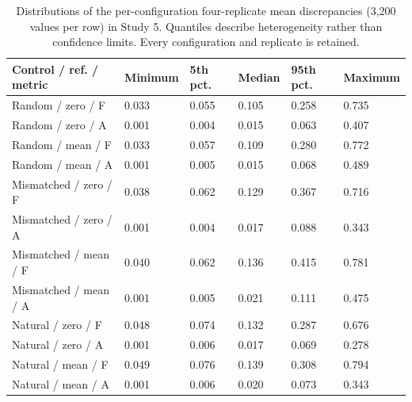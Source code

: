 \begin{table}[H]
\centering\footnotesize
\setlength{\tabcolsep}{3pt}
\caption{Distributions of the per-configuration four-replicate mean discrepancies (3,200 values per row) in Study 5. Quantiles describe heterogeneity rather than confidence limits. Every configuration and replicate is retained.}
\label{tab:null-distributions}
\begin{tabularx}{\linewidth}{@{}lYYYYY@{}}
\toprule
Control / ref. / metric & Minimum & 5th pct. & Median & 95th pct. & Maximum \\
\midrule
Random / zero / F & 0.033 & 0.055 & 0.105 & 0.258 & 0.735 \\
Random / zero / A & 0.001 & 0.004 & 0.015 & 0.063 & 0.407 \\
Random / mean / F & 0.033 & 0.057 & 0.109 & 0.280 & 0.772 \\
Random / mean / A & 0.001 & 0.005 & 0.015 & 0.068 & 0.489 \\
Mismatched / zero / F & 0.038 & 0.062 & 0.129 & 0.367 & 0.716 \\
Mismatched / zero / A & 0.001 & 0.004 & 0.017 & 0.088 & 0.343 \\
Mismatched / mean / F & 0.040 & 0.062 & 0.136 & 0.415 & 0.781 \\
Mismatched / mean / A & 0.001 & 0.005 & 0.021 & 0.111 & 0.475 \\
Natural / zero / F & 0.048 & 0.074 & 0.132 & 0.287 & 0.676 \\
Natural / zero / A & 0.001 & 0.006 & 0.017 & 0.069 & 0.278 \\
Natural / mean / F & 0.049 & 0.076 & 0.139 & 0.308 & 0.794 \\
Natural / mean / A & 0.001 & 0.006 & 0.020 & 0.073 & 0.343 \\
\bottomrule
\end{tabularx}
\end{table}

